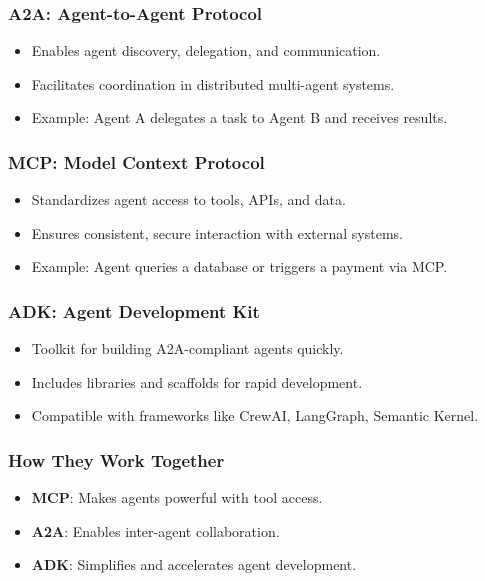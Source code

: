 \begin{frame}[fragile]\frametitle{A2A: Agent-to-Agent Protocol}
    \begin{itemize}
        \item Enables agent discovery, delegation, and communication.
        \item Facilitates coordination in distributed multi-agent systems.
        \item Example: Agent A delegates a task to Agent B and receives results.
    \end{itemize}
\end{frame}

\begin{frame}[fragile]\frametitle{MCP: Model Context Protocol}
    \begin{itemize}
        \item Standardizes agent access to tools, APIs, and data.
        \item Ensures consistent, secure interaction with external systems.
        \item Example: Agent queries a database or triggers a payment via MCP.
    \end{itemize}
\end{frame}

\begin{frame}[fragile]\frametitle{ADK: Agent Development Kit}
    \begin{itemize}
        \item Toolkit for building A2A-compliant agents quickly.
        \item Includes libraries and scaffolds for rapid development.
        \item Compatible with frameworks like CrewAI, LangGraph, Semantic Kernel.
    \end{itemize}
\end{frame}

\begin{frame}[fragile]\frametitle{How They Work Together}
    \begin{itemize}
        \item \textbf{MCP}: Makes agents powerful with tool access.
        \item \textbf{A2A}: Enables inter-agent collaboration.
        \item \textbf{ADK}: Simplifies and accelerates agent development.
    \end{itemize}
\end{frame}

